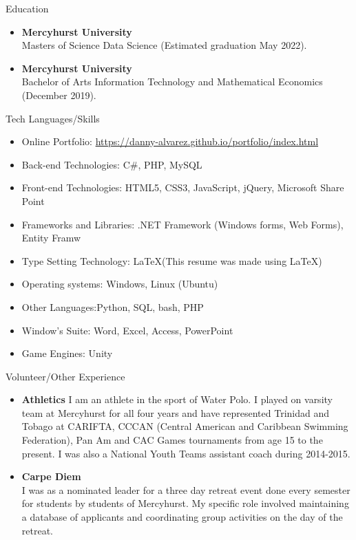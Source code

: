 \documentclass[11pt]{resume} %
\newcommand{\bold}[1]{\textbf{#1}}
\begin{document}
\begin{rSection}{Education}

\begin{itemize}
	\item\bold{Mercyhurst University}\\
	Masters of Science Data Science  (Estimated graduation May 2022).
	
	\item\bold{Mercyhurst University}\\
	Bachelor of Arts Information Technology and Mathematical Economics (December 2019).

\end{itemize}
\end{rSection}
\vspace{1in}
\begin{rSection}{Tech Languages/Skills}
\begin{itemize}
\item Online Portfolio: \url{https://danny-alvarez.github.io/portfolio/index.html}
\item Back-end Technologies: C\#, PHP, MySQL
\item Front-end Technologies: HTML5, CSS3, JavaScript, jQuery, Microsoft Share Point
\item Frameworks and Libraries: .NET Framework (Windows forms, Web Forms), Entity Framw
\item Type Setting Technology: \LaTeX\xspace (This resume was made using \LaTeX)
\item Operating systems: Windows, Linux (Ubuntu)
\item Other Languages:Python, SQL, bash, PHP
\item Window's Suite: Word, Excel, Access, PowerPoint
\item Game Engines: Unity
\end{itemize}
\end{rSection}


\begin{rSection}{Volunteer/Other Experience}
	\begin{itemize}
		\item\bold{Athletics}
		I am an athlete in the sport of Water Polo. I played on varsity team at Mercyhurst for all four years and have represented Trinidad and Tobago at CARIFTA, CCCAN (Central American and Caribbean Swimming Federation), Pan Am and CAC Games tournaments from age 15 to the present. I was also a National Youth Teams assistant coach during 2014-2015. 
		\item\bold{Carpe Diem}\\
		I was as a nominated leader for a three day retreat event done every semester for students by students of Mercyhurst. My specific role involved maintaining a database of applicants and coordinating group activities on the day of the retreat. 
	\end{itemize}
\end{rSection}
\end{document}
